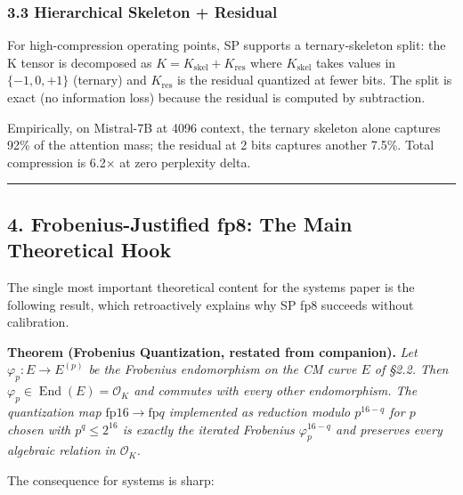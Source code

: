 \documentclass[
  11pt,
]{article}
\begin{document}
\hypertarget{hierarchical-skeleton-residual}{%
\subsubsection{3.3 Hierarchical Skeleton +
Residual}\label{hierarchical-skeleton-residual}}

For high-compression operating points, SP supports a ternary-skeleton
split: the K tensor is decomposed as
\(K = K_{\text{skel}} + K_{\text{res}}\) where \(K_{\text{skel}}\) takes
values in \(\{-1, 0, +1\}\) (ternary) and \(K_{\text{res}}\) is the
residual quantized at fewer bits. The split is exact (no information
loss) because the residual is computed by subtraction.

Empirically, on Mistral-7B at 4096 context, the ternary skeleton alone
captures 92\% of the attention mass; the residual at 2 bits captures
another 7.5\%. Total compression is 6.2× at zero perplexity delta.

\begin{center}\rule{0.5\linewidth}{0.5pt}\end{center}

\hypertarget{frobenius-justified-fp8-the-main-theoretical-hook}{%
\subsection{4. Frobenius-Justified fp8: The Main Theoretical
Hook}\label{frobenius-justified-fp8-the-main-theoretical-hook}}

The single most important theoretical content for the systems paper is
the following result, which retroactively explains why SP fp8 succeeds
without calibration.

\textbf{Theorem (Frobenius Quantization, restated from companion).}
\emph{Let \(\varphi_p : E \to E^{(p)}\) be the Frobenius endomorphism on
the CM curve \(E\) of §2.2. Then
\(\varphi_p \in \operatorname{End}(E) = \mathcal{O}_K\) and commutes
with every other endomorphism. The quantization map
\(\mathrm{fp}16 \to \mathrm{fp}q\) implemented as reduction modulo
\(p^{16-q}\) for \(p\) chosen with \(p^q \leq 2^{16}\) is exactly the
iterated Frobenius \(\varphi_p^{16-q}\) and preserves every algebraic
relation in \(\mathcal{O}_K\).}

The consequence for systems is sharp:
\end{document}
